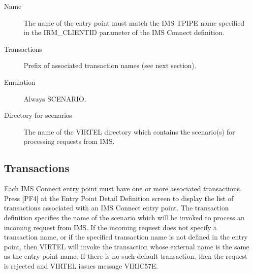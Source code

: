 \documentclass[letterpaper,10pt,english]{sphinxmanual}
\begin{document}
\begin{description}
\item[{Name}] \leavevmode
The name of the entry point must match the IMS TPIPE name specified
in the IRM\_CLIENTID parameter of the IMS Connect definition.

\item[{Transactions}] \leavevmode
Prefix of associated transaction names (see next section).

\item[{Emulation}] \leavevmode
Always SCENARIO.

\item[{Directory for scenarios}] \leavevmode
The name of the VIRTEL directory which contains the scenario(s) for
processing requests from IMS.

\end{description}

\ignorespaces 

\subsection{Transactions}
\label{\detokenize{connectivity_guide:transactions}}\label{\detokenize{connectivity_guide:index-25}}
Each IMS Connect entry point must have one or more associated transactions. Press {[}PF4{]} at the Entry Point Detail Definition screen to display the list of transactions associated with an IMS Connect entry point. The transaction definition specifies the name of the scenario which will be invoked to process an incoming request from IMS. If the incoming request does not specify a transaction name, or if the specified transaction name is not defined in the entry point, then VIRTEL will invoke the transaction whose external name is the same as the entry point name. If there is no such default transaction, then the request is rejected and VIRTEL issues message VIRIC57E.
\end{document}
